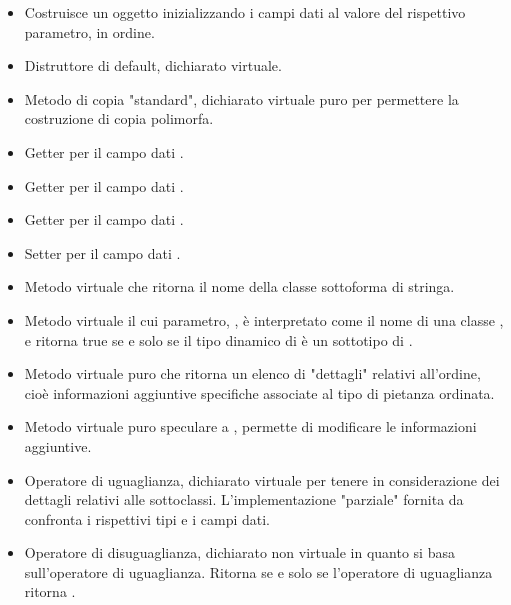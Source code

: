 \begin{itemize}
	\item {}\newline
	Costruisce un oggetto inizializzando i campi dati al valore del rispettivo parametro, in ordine.
	\item {}\newline
	Distruttore di default, dichiarato virtuale.
	\item {}\newline
	Metodo di copia "standard", dichiarato virtuale puro per permettere la costruzione di copia polimorfa.
	\item {}\newline
	Getter per il campo dati .
	\item {}\newline
	Getter per il campo dati .
	\item {}\newline
	Getter per il campo dati .
	\item {}\newline
	Setter per il campo dati .
	\item {}\newline
	Metodo virtuale che ritorna il nome della classe sottoforma di stringa.
	\item {}\newline
	Metodo virtuale il cui parametro, , è interpretato come il nome di una classe , e ritorna true se e solo se il tipo dinamico di  è un sottotipo di .
	\item {}\newline
	Metodo virtuale puro che ritorna un elenco di "dettagli" relativi all'ordine, cioè informazioni aggiuntive specifiche associate al tipo di pietanza ordinata.
	\item {}\newline
	Metodo virtuale puro speculare a , permette di modificare le informazioni aggiuntive.
	\item {}\newline
	Operatore di uguaglianza, dichiarato virtuale per tenere in considerazione dei dettagli relativi alle sottoclassi. L'implementazione "parziale" fornita da  confronta i rispettivi tipi e i campi dati.
	\item {}\newline
	Operatore di disuguaglianza, dichiarato non virtuale in quanto si basa sull'operatore di uguaglianza. Ritorna  se e solo se l'operatore di uguaglianza ritorna .
\end{itemize}
